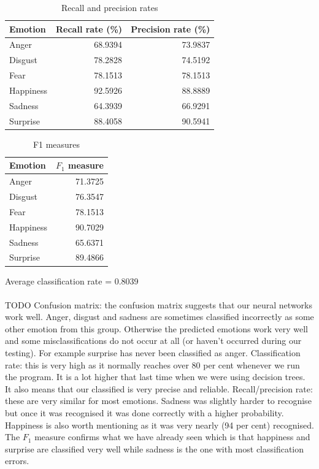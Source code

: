 \documentclass[12pt]{article}
\begin{document}
\begin{table}
\centering
\begin{tabular}{l | r r}
Emotion & Recall rate (\%) & Precision rate (\%) \\
\hline
Anger     & 68.9394 & 73.9837 \\
Disgust   & 78.2828 & 74.5192 \\
Fear      & 78.1513 & 78.1513 \\
Happiness & 92.5926 & 88.8889 \\
Sadness   & 64.3939 & 66.9291 \\
Surprise  & 88.4058 & 90.5941 \\
\end{tabular}
\caption{Recall and precision rates}
\end{table}

\begin{table}
\centering
\begin{tabular}{l | r}
Emotion & \( F_1 \) measure \\
\hline
Anger     & 71.3725 \\
Disgust   & 76.3547 \\
Fear      & 78.1513 \\
Happiness & 90.7029 \\
Sadness   & 65.6371 \\
Surprise  & 89.4866 \\
\end{tabular}
\caption{F1 measures}
\end{table}

Average classification rate = 0.8039 \\ \\
TODO
Confusion matrix: the confusion matrix suggests that our neural networks work well. Anger, disgust and sadness are sometimes classified incorrectly as some other emotion from this group. Otherwise the predicted emotions work very well and some misclassifications do not occur at all (or haven't occurred during our testing). For example surprise has never been classified as anger. Classification rate: this is very high as it normally reaches over 80 per cent whenever we run the program. It is a lot higher that last time when we were using decision trees. It also means that our classified is very precise and reliable. Recall/precision rate: these are very similar for most emotions. Sadness was slightly harder to recognise but once it was recognised it was done correctly with a higher probability. Happiness is also worth mentioning as it was very nearly (94 per cent) recognised. The $F_1$ measure confirms what we have already seen which is that happiness and surprise are classified very well while sadness is the one with most classification errors.
\end{document}
